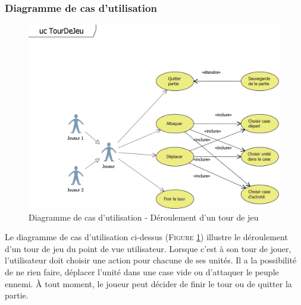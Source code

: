 \documentclass[a4paper,11pt]{article}
\begin{document}
		\subsubsection{Diagramme de cas d'utilisation}
			\begin{figure}[ht!]
				\includegraphics{ucTourDeJeu.png}
				\caption{Diagramme de cas d'utilisation - Déroulement d'un tour de jeu}
				\label{fig:uctour}
			\end{figure}
			\vspace*{1cm}
			Le diagramme de cas d'utilisation ci-dessus (\textsc{Figure \ref{fig:uctour}}) illustre le déroulement d'un tour de jeu du point de vue utilisateur. Lorsque c'est à son tour de jouer, l'utilisateur doit choisir une action pour chacune de ses unités. Il a la possibilité de ne rien faire, déplacer l'unité dans une case vide ou d'attaquer le peuple ennemi. À  tout moment, le joueur peut décider de finir le tour ou de quitter la partie.
			\newpage
\end{document}
